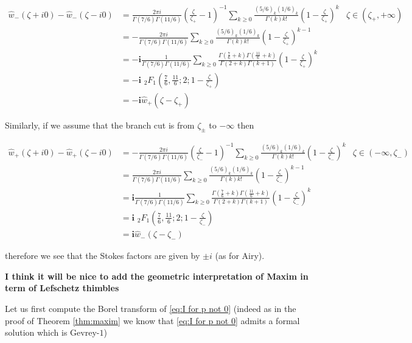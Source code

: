 \documentclass[11pt,a4paper,twoside,leqno,noamsfonts]{amsart}
\numberwithin{equation}{section}
\begin{document}
\begin{align*}
\hat{w}_-(\zeta+i0)-\hat{w}_-(\zeta-i0)&=\frac{2\pi i}{\Gamma(7/6)\Gamma(11/6)}\left(\frac{\zeta}{\zeta_+}-1\right)^{-1}\sum_{k\geq 0}\frac{(5/6)_k(1/6)_k}{\Gamma(k)k!}\left(1-\frac{\zeta}{\zeta_+}\right)^k & \zeta\in\left(\zeta_+,+\infty\right) & \\
&=-\frac{2\pi i}{\Gamma(7/6)\Gamma(11/6)} \sum_{k\geq 0}\frac{(5/6)_k(1/6)_k}{\Gamma(k)k!}\left(1-\frac{\zeta}{\zeta_+}\right)^{k-1} & \\
&=\mathbf{-i}\frac{1}{\Gamma(7/6)\Gamma(11/6)}\sum_{k\geq 0}\frac{\Gamma\left(\tfrac{7}{6}+k\right)\Gamma\left(\tfrac{11}{6}+k\right)}{\Gamma(2+k)\Gamma(k+1)}\left(1-\frac{\zeta}{\zeta_+}\right)^k & \\
&=\mathbf{-i}\,\, {}_2F_1\left(\frac{7}{6},\frac{11}{6};2;1-\frac{\zeta}{\zeta_+}\right) & \\
&=\mathbf{-i}\hat{w}_+(\zeta-\zeta_+)
\end{align*}

Similarly, if we assume that the branch cut is from $\zeta_{\pm}$ to $-\infty$ then

\begin{align*}
\hat{w}_+(\zeta+i0)-\hat{w}_+(\zeta-i0)&=-\frac{2\pi i}{\Gamma(7/6)\Gamma(11/6)}\left(\frac{\zeta}{\zeta_-}-1\right)^{-1}\sum_{k\geq 0}\frac{(5/6)_k(1/6)_k}{\Gamma(k)k!}\left(1-\frac{\zeta}{\zeta_-}\right)^k & \zeta\in\left(-\infty,\zeta_-\right) & \\
&=\frac{2\pi i}{\Gamma(7/6)\Gamma(11/6)} \sum_{k\geq 0}\frac{(5/6)_k(1/6)_k}{\Gamma(k)k!}\left(1-\frac{\zeta}{\zeta_-}\right)^{k-1} & \\
&=\mathbf{i}\frac{1}{\Gamma(7/6)\Gamma(11/6)}\sum_{k\geq 0}\frac{\Gamma\left(\tfrac{7}{6}+k\right)\Gamma\left(\tfrac{11}{6}+k\right)}{\Gamma(2+k)\Gamma(k+1)}\left(1-\frac{\zeta}{\zeta_-}\right)^k & \\
&=\mathbf{i}\,\, {}_2F_1\left(\frac{7}{6},\frac{11}{6};2;1-\frac{\zeta}{\zeta_-}\right) & \\
&=\mathbf{i}\hat{w}_-(\zeta-\zeta_-)
\end{align*}

therefore we see that the Stokes factors are given by $\pm i$ (as for Airy). 

\textbf{I think it will be nice to add the geometric interpretation of Maxim in term of Lefschetz thimbles}

Let us first compute the Borel transform of \eqref{eq:I for p not 0} (indeed as in the proof of Theorem \ref{thm:maxim} we know that \eqref{eq:I for p not 0} admits a formal solution which is Gevrey-$1$)
\end{document}
